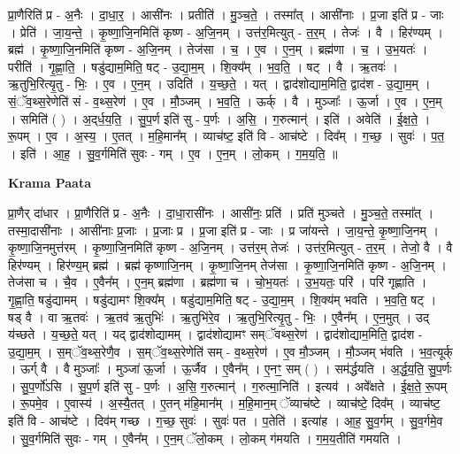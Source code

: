 \documentclass[17pt]{extarticle}
\begin{document}
प्रा॒णैरिति॑ प्र - अ॒नैः । दा॒धा॒र॒ । आसी॑नः । प्रतीति॑ । मु॒ञ्च॒ते॒ । तस्मा᳚त् । आसी॑नाः । प्र॒जा इति॑ प्र - जाः । प्रेति॑ । जा॒य॒न्ते॒ । कृ॒ष्णा॒जि॒नमिति॑ कृष्ण - अ॒जि॒नम् । उत्त॑र॒मित्युत् - त॒र॒म् । तेजः॑ । वै । हिर॑ण्यम् । ब्रह्म॑ । कृ॒ष्णा॒जि॒नमिति॑ कृष्ण - अ॒जि॒नम् । तेज॑सा । च॒ । ए॒व । ए॒न॒म् । ब्रह्म॑णा । च॒ । उ॒भ॒यतः॑ । परीति॑ । गृ॒ह्णा॒ति॒ । षडु॑द्याम॒मिति॒ षट् - उ॒द्या॒म॒म् । शि॒क्य᳚म् । भ॒व॒ति॒ । षट् । वै । ऋ॒तवः॑ । ऋ॒तुभि॒रित्यृ॒तु - भिः॒ । ए॒व । ए॒न॒म् । उदिति॑ । य॒च्छ॒ते॒ । यत् । द्वाद॑शोद्याम॒मिति॒ द्वाद॑श - उ॒द्या॒म॒म् । सं॒ॅव॒थ्स॒रेणेति॑ सं - व॒थ्स॒रेण॑ । ए॒व । मौ॒ञ्जम् । भ॒व॒ति॒ । ऊर्क् । वै । मुञ्जाः᳚ । ऊ॒र्जा । ए॒व । ए॒न॒म् । समिति॑ ( ) । अ॒द्‌र्ध॒य॒ति॒ । सु॒प॒र्ण इति॑ सु - प॒र्णः । अ॒सि॒ । ग॒रुत्मान्॑ । इति॑ । अवेति॑ । ई॒क्ष॒ते॒ । रू॒पम् । ए॒व । अ॒स्य॒ । ए॒तत् । म॒हि॒मान᳚म् । व्याच॑ष्ट॒ इति॑ वि - आच॑ष्टे । दिव᳚म् । ग॒च्छ॒ । सुवः॑ । प॒त॒ । इति॑ । आ॒ह॒ । सु॒व॒र्गमिति॑ सुवः - गम् । ए॒व । ए॒न॒म् । लो॒कम् । ग॒म॒य॒ति॒ ॥  \newline


\textbf{Krama Paata} \newline

प्रा॒णैर् दा॑धार । प्रा॒णैरिति॑ प्र - अ॒नैः । दा॒धा॒रासी॑नः । आसी॑नः॒ प्रति॑ । प्रति॑ मुञ्चते । मु॒ञ्च॒ते॒ तस्मा᳚त् । तस्मा॒दासी॑नाः । आसी॑नाः प्र॒जाः । प्र॒जाः प्र । प्र॒जा इति॑ प्र - जाः । प्र जा॑यन्ते । जा॒य॒न्ते॒ कृ॒ष्णा॒जि॒नम् । कृ॒ष्णा॒जि॒नमुत्त॑रम् । कृ॒ष्णा॒जि॒नमिति॑ कृष्ण - अ॒जि॒नम् । उत्त॑र॒म् तेजः॑ । उत्त॑र॒मित्युत् - त॒र॒म् । तेजो॒ वै । वै हिर॑ण्यम् । हिर॑ण्य॒म् ब्रह्म॑ । ब्रह्म॑ कृष्णाजि॒नम् । कृ॒ष्णा॒जि॒नम् तेज॑सा । कृ॒ष्णा॒जि॒नमिति॑ कृष्ण - अ॒जि॒नम् । तेज॑सा च । चै॒व । ए॒वैन᳚म् । ए॒न॒म् ब्रह्म॑णा । ब्रह्म॑णा च । चो॒भ॒यतः॑ । उ॒भ॒यतः॒ परि॑ । परि॑ गृह्णाति । गृ॒ह्णा॒ति॒ षडु॑द्यामम् । षडु॑द्यामꣳ शि॒क्य᳚म् । षडु॑द्याम॒मिति॒ षट् - उ॒द्या॒म॒म् । शि॒क्य॑म् भवति । भ॒व॒ति॒ षट् । षड् वै । वा ऋ॒तवः॑ । ऋ॒तव॑ ऋ॒तुभिः॑ । ऋ॒तुभि॑रे॒व । ऋ॒तुभि॒रित्यृ॒तु - भिः॒ । ए॒वैन᳚म् । ए॒न॒मुत् । उद् य॑च्छते । य॒च्छ॒ते॒ यत् । यद् द्वाद॑शोद्यामम् । द्वाद॑शोद्यामꣳ सम्ॅवथ्स॒रेण॑ । द्वाद॑शोद्याम॒मिति॒ द्वाद॑श - उ॒द्या॒म॒म् । स॒म्ॅव॒थ्स॒रेणै॒व । स॒म्ॅव॒थ्स॒रेणेति॑ सम् - व॒थ्स॒रेण॑ । ए॒व मौ॒ञ्जम् । मौ॒ञ्जम् भ॑वति । भ॒व॒त्यूर्क् । ऊर्ग् वै । वै मुञ्जाः᳚ । मुञ्जा॑ ऊ॒र्जा । ऊ॒र्जैव । ए॒वैन᳚म् । ए॒नꣳ॒॒ सम् ( ) । सम॑र्द्धयति । अ॒र्द्ध॒य॒ति॒ सु॒प॒र्णः । सु॒प॒र्णो॑ऽसि । सु॒प॒र्ण इति॑ सु - प॒र्णः । अ॒सि॒ ग॒रुत्मान्॑ । ग॒रुत्मा॒निति॑ । इत्यव॑ । अवे᳚क्षते । ई॒क्ष॒ते॒ रू॒पम् । रू॒पमे॒व । ए॒वास्य॑ । अ॒स्यै॒तत् । ए॒तन् म॑हि॒मान᳚म् । म॒हि॒मान॒म् ॅव्याच॑ष्टे । व्याच॑ष्टे॒ दिव᳚म् । व्याच॑ष्ट॒ इति॑ वि - आच॑ष्टे । दिव॑म् गच्छ । ग॒च्छ॒ सुवः॑ । सुवः॑ पत । प॒तेति॑ । इत्या॑ह । आ॒ह॒ सु॒व॒र्गम् । सु॒व॒र्गमे॒व । सु॒व॒र्गमिति॑ सुवः - गम् । ए॒वैन᳚म् । ए॒न॒म् ॅलो॒कम् । लो॒कम् ग॑मयति । ग॒म॒य॒तीति॑ गमयति । \newline
\end{document}
